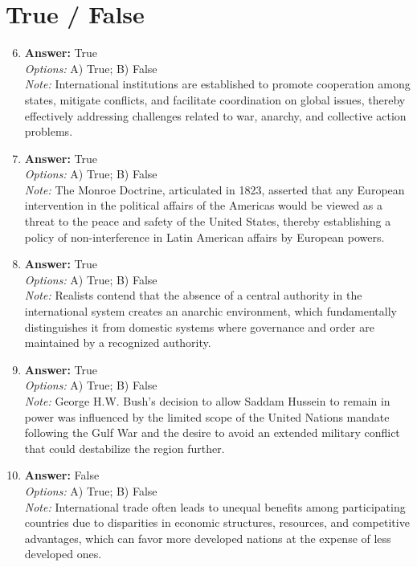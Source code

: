 \documentclass[12pt]{article}
\begin{document}
\section*{True / False}
\begin{enumerate}[label=\arabic*.]
\setcounter{enumi}{5}
\item \textbf{Answer:} True
\\ \textit{Options:} A) True; B) False
\\ \textit{Note:} International institutions are established to promote cooperation among states, mitigate conflicts, and facilitate coordination on global issues, thereby effectively addressing challenges related to war, anarchy, and collective action problems.
\item \textbf{Answer:} True
\\ \textit{Options:} A) True; B) False
\\ \textit{Note:} The Monroe Doctrine, articulated in 1823, asserted that any European intervention in the political affairs of the Americas would be viewed as a threat to the peace and safety of the United States, thereby establishing a policy of non-interference in Latin American affairs by European powers.
\item \textbf{Answer:} True
\\ \textit{Options:} A) True; B) False
\\ \textit{Note:} Realists contend that the absence of a central authority in the international system creates an anarchic environment, which fundamentally distinguishes it from domestic systems where governance and order are maintained by a recognized authority.
\item \textbf{Answer:} True
\\ \textit{Options:} A) True; B) False
\\ \textit{Note:} George H.W. Bush's decision to allow Saddam Hussein to remain in power was influenced by the limited scope of the United Nations mandate following the Gulf War and the desire to avoid an extended military conflict that could destabilize the region further.
\item \textbf{Answer:} False
\\ \textit{Options:} A) True; B) False
\\ \textit{Note:} International trade often leads to unequal benefits among participating countries due to disparities in economic structures, resources, and competitive advantages, which can favor more developed nations at the expense of less developed ones.
\end{enumerate}
\end{document}
